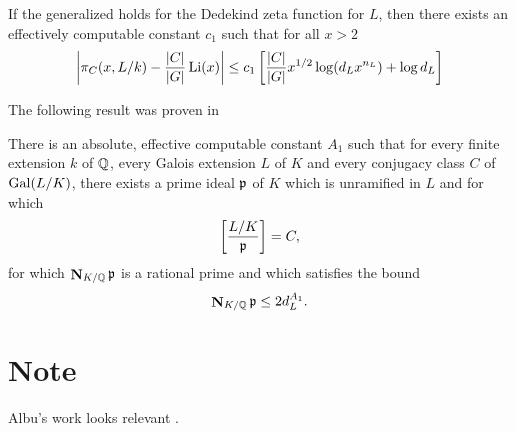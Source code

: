 \begin{proposition}
If the generalized  holds for the Dedekind
zeta function for $L$, then there exists an effectively computable
constant $c_{1}$ such that for all $x>2$
\[
\left|\pi_{C}(x, L/k) - \frac{|C|}{|G|} \mathop{\rm Li}\nolimits(x)\right|
\le c_{1} \left[ \frac{|C|}{|G|} x^{1/2} \log (d_{L} x^{n_{L}}) + \log d_{L}\right]
\]
\end{proposition}

The following result was proven in \cite{Lagarias79}

\begin{proposition} There is an
absolute, effective computable constant $A_1$ such that for every
finite extension $k$ of $\mathbb{Q}$, every Galois extension $L$ of $K$ and
every conjugacy class $C$ of $\mathop{\rm Gal}\nolimits(L/K)$, there exists a prime ideal
${\frak p}$ of $K$ which is unramified in $L$ and for which 
\[
\left[ \frac{L/K}{\frak p} \right ] = C,
\]
for which $\mathop{\mathbf{N}}\nolimits_{K/\mathbb{Q}} {\frak p}$ is a rational prime and which
satisfies the bound
\[
\mathop{\mathbf{N}}\nolimits_{K/\mathbb{Q}} {\frak p} \le 2 d_L^{A_1}.
\]
\end{proposition}

\section*{Note}

\footnotesize

 Albu's work looks relevant \cite{Albu92}.

\normalsize


